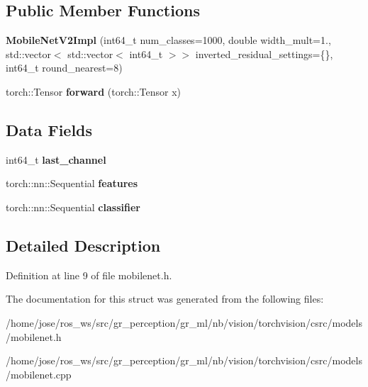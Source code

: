 \subsection*{Public Member Functions}
\begin{DoxyCompactItemize}
\item 
\mbox{\label{structvision_1_1models_1_1MobileNetV2Impl_a81f3347e74478b3f4c0c0a965a03d4a1}} 
{\bfseries Mobile\+Net\+V2\+Impl} (int64\+\_\+t num\+\_\+classes=1000, double width\+\_\+mult=1., std\+::vector$<$ std\+::vector$<$ int64\+\_\+t $>$$>$ inverted\+\_\+residual\+\_\+settings=\{\}, int64\+\_\+t round\+\_\+nearest=8)
\item 
\mbox{\label{structvision_1_1models_1_1MobileNetV2Impl_ace4222f0eb783a3cadbb518785a5e65d}} 
torch\+::\+Tensor {\bfseries forward} (torch\+::\+Tensor x)
\end{DoxyCompactItemize}
\subsection*{Data Fields}
\begin{DoxyCompactItemize}
\item 
\mbox{\label{structvision_1_1models_1_1MobileNetV2Impl_a24d9fc89b8f8f605803d05fb4805ed63}} 
int64\+\_\+t {\bfseries last\+\_\+channel}
\item 
\mbox{\label{structvision_1_1models_1_1MobileNetV2Impl_a898a69025cd494955b409948ac6af714}} 
torch\+::nn\+::\+Sequential {\bfseries features}
\item 
\mbox{\label{structvision_1_1models_1_1MobileNetV2Impl_a875b23d95ef787d8b8814124c50f4cb8}} 
torch\+::nn\+::\+Sequential {\bfseries classifier}
\end{DoxyCompactItemize}


\subsection{Detailed Description}


Definition at line 9 of file mobilenet.\+h.



The documentation for this struct was generated from the following files\+:\begin{DoxyCompactItemize}
\item 
/home/jose/ros\+\_\+ws/src/gr\+\_\+perception/gr\+\_\+ml/nb/vision/torchvision/csrc/models/mobilenet.\+h\item 
/home/jose/ros\+\_\+ws/src/gr\+\_\+perception/gr\+\_\+ml/nb/vision/torchvision/csrc/models/mobilenet.\+cpp\end{DoxyCompactItemize}
